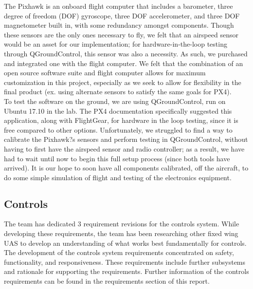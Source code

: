 \documentclass{article}
\begin{document}
\noindent The Pixhawk is an onboard flight computer that includes a barometer, three degree of freedom (DOF) gyroscope, three DOF accelerometer, and three DOF magnetometer built in, with some redundancy amongst components. Though these sensors are the only ones necessary to fly, we felt that an airspeed sensor would be an asset for our implementation; for hardware-in-the-loop testing through QGroundControl, this sensor was also a necessity. As such, we purchased and integrated one with the flight computer. We felt that the combination of an open source software suite and flight computer allows for maximum customization in this project, especially as we seek to allow for flexibility in the final product (ex. using alternate sensors to satisfy the same goals for PX4).\\

\noindent To test the software on the ground, we are using QGroundControl, run on Ubuntu 17.10 in the lab. The PX4 documentation specifically suggested this application, along with FlightGear, for hardware in the loop testing, since it is free compared to other options. Unfortunately, we struggled to find a way to calibrate the Pixhawk?s sensors and perform testing in QGroundControl, without having to first have the airspeed sensor and radio controller; as a result, we have had to wait until now to begin this full setup process (since both tools have arrived). It is our hope to soon have all components calibrated, off the aircraft, to do some simple simulation of flight and testing of the electronics equipment.\\

\subsection{Controls}
\noindent The team has dedicated 3 requirement revisions for the controls system. While developing these requirements, the team has been researching other fixed wing UAS to develop an understanding of what works best fundamentally for controls.\\

\noindent The development of the controls system requirements concentrated on safety, functionality, and responsiveness. These requirements include further subsystems and rationale for supporting the requirements. Further information of the controls requirements can be found in the requirements section of this report. \\
\end{document}

